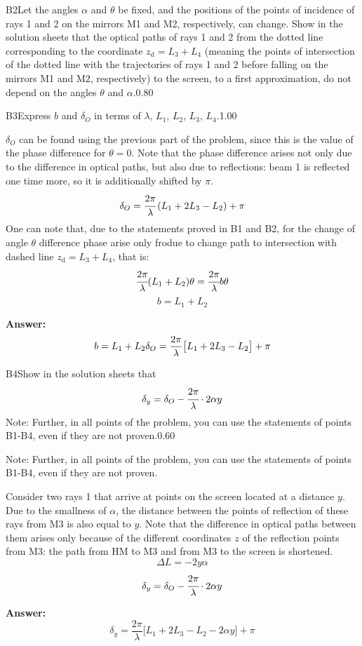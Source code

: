 \documentclass[11pt,a4paper]{article}
\begin{document}
\begin{solcard}{B2}{Let the angles $\alpha$ and $\theta$ be fixed, and the positions of the points of incidence of rays 1 and 2 on the mirrors M1 and M2, respectively, can change. Show in the solution sheets that the optical paths of rays 1 and 2 from the dotted line corresponding to the coordinate $z_\text{d}=L_3+L_4$ (meaning the points of intersection of the dotted line with the trajectories of rays 1 and 2 before falling on the mirrors M1 and M2, respectively) to the screen, to a first approximation, do not depend on the angles $\theta$ and $\alpha$.}{0.80}
\end{solcard}

\begin{solcard}{B3}{Express $b$ and $\delta_O$ in terms of $\lambda$, $L_1$, $L_2$, $L_3$, $L_4$.}{1.00}

$\delta_O$ can be found using the previous part of the problem, since this is the value of the phase difference for $\theta = 0$. Note that the phase difference arises not only due to the difference in optical paths, but also due to reflections: beam 1 is reflected one time more, so it is additionally shifted by $\pi$. $$\delta_O = \cfrac{2\pi}{\lambda}\left(L_1+2L_3-L_2\right) + \pi$$One can note that, due to the statements proved in B1 and B2, for the change of angle $\theta$ difference phase arise only frodue to change path to intersection with dashed line $z_\text{d} = L_3 + L_4$, that is: $$\cfrac{2\pi}{\lambda}(L_1 + L_2) \theta = \cfrac{2\pi}{\lambda}b\theta$$$$b = L_1+L_2$$

\par\smallskip\noindent\textbf{Answer:} \[b=L_1+L_2\\\delta_O=\frac{2\pi}\lambda\big[L_1+2L_3-L_2\big]+\pi\]
\end{solcard}

\begin{solcard}{B4}{Show in the solution sheets that $$\delta_y=\delta_O-\cfrac{2\pi}{\lambda}\cdot 2\alpha y $$ Note: Further, in all points of the problem, you can use the statements of points B1-B4, even if they are not proven.}{0.60}

Note: Further, in all points of the problem, you can use the statements of points B1-B4, even if they are not proven.


Consider two rays 1 that arrive at points on the screen located at a distance $y$. Due to the smallness of $\alpha$, the distance between the points of reflection of these rays from M3 is also equal to $y$. Note that the difference in optical paths between them arises only because of the different coordinates $z$ of the reflection points from M3: the path from HM to M3 and from M3 to the screen is shortened. $$\Delta L = -2y\alpha$$$$\delta_y = \delta_O - \cfrac{2\pi}{\lambda}\cdot 2\alpha y$$

\par\smallskip\noindent\textbf{Answer:} \[\delta_y=\frac{2\pi}\lambda\big[L_1+2L_3-L_2-2\alpha y\big]+\pi\]
\end{solcard}
\end{document}
